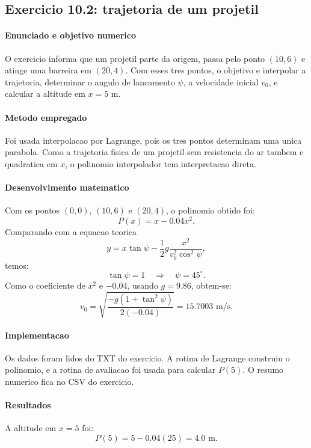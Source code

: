 \documentclass[../main.tex]{subfiles}
\begin{document}
\subsection{Exercicio 10.2: trajetoria de um projetil}

\paragraph{Enunciado e objetivo numerico}
O exercicio informa que um projetil parte da origem, passa pelo ponto
\((10,6)\) e atinge uma barreira em \((20,4)\). Com esses tres pontos, o
objetivo e interpolar a trajetoria, determinar o angulo de lancamento
\(\psi\), a velocidade inicial \(v_0\), e calcular a altitude em \(x=5\) m.

\paragraph{Metodo empregado}
Foi usada interpolacao por Lagrange, pois os tres pontos determinam uma unica
parabola. Como a trajetoria fisica de um projetil sem resistencia do ar tambem
e quadratica em \(x\), o polinomio interpolador tem interpretacao direta.

\paragraph{Desenvolvimento matematico}
Com os pontos \((0,0)\), \((10,6)\) e \((20,4)\), o polinomio obtido foi:
\[
    P(x)=x-0.04x^2.
\]
Comparando com a equacao teorica
\[
    y=x\tan\psi-\frac{1}{2}g\frac{x^2}{v_0^2\cos^2\psi},
\]
temos:
\[
    \tan\psi=1 \quad\Rightarrow\quad \psi=45^\circ.
\]
Como o coeficiente de \(x^2\) e \(-0.04\), usando \(g=9.86\), obtem-se:
\[
    v_0=\sqrt{\frac{-g(1+\tan^2\psi)}{2(-0.04)}}=15.7003\text{ m/s}.
\]

\paragraph{Implementacao}
Os dados foram lidos do TXT do exercicio. A rotina de Lagrange construiu o
polinomio, e a rotina de avaliacao foi usada para calcular \(P(5)\). O resumo
numerico fica no CSV do exercicio.

\paragraph{Resultados}
A altitude em \(x=5\) foi:
\[
    P(5)=5-0.04(25)=4.0\text{ m}.
\]
\end{document}
